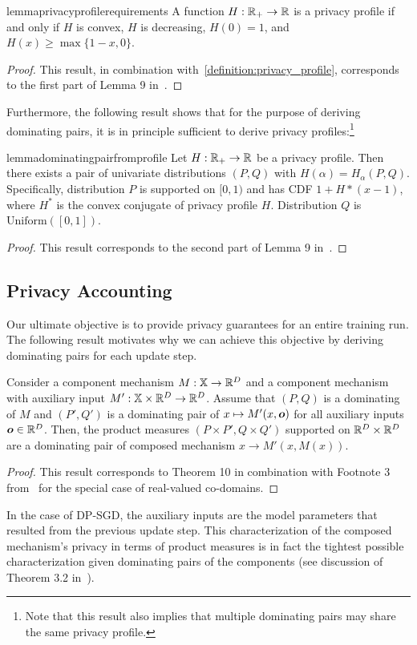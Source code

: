 \begin{restatable}{lemma}{privacyprofilerequirements}\label{lemma:privacy_profile_requirements}
    A function $H : {\mathbb{R}}_+ \rightarrow {\mathbb{R}}$ is a privacy profile if and only if
    $H$ is convex, $H$ is decreasing, $H(0) = 1$, and $H(x) \geq \max\{1-x, 0\}$.
\end{restatable}
\begin{proof}
    This result, in combination with~\cref{definition:privacy_profile}, corresponds to the first part of  Lemma 9 in~\cite{zhu2022optimal}.
\end{proof}
Furthermore, the following result shows that for the purpose of deriving dominating pairs, it is in principle sufficient to derive privacy profiles:\footnote{Note that this result also implies that multiple dominating pairs may share the same privacy profile.}
\begin{restatable}{lemma}{dominatingpairfromprofile}\label{lemma:dominating_pair_from_profile}
    Let $H: {\mathbb{R}}_+ \rightarrow {\mathbb{R}}$ be a privacy profile.
    Then there exists a pair of univariate distributions $(P, Q)$ with $H(\alpha) = H_\alpha(P,Q)$.
    Specifically, distribution $P$ is supported on $[0,1)$ and has CDF $1 + H*(x-1)$, where $H^*$ is the convex conjugate of privacy profile $H$.
    Distribution $Q$ is $\mathrm{Uniform}([0,1])$.
\end{restatable}
\begin{proof}
    This result corresponds to the second part of Lemma 9 in~\cite{zhu2022optimal}.
\end{proof}

\subsection{Privacy Accounting}\label{appendix:background_accounting}
Our ultimate objective is to provide privacy guarantees for an entire training run.
The following result motivates why we can achieve this objective by deriving dominating pairs for each update step.
\begin{lemma}\label{lemma:general_composition}
    Consider a component mechanism $M : {\mathbb{X}} \rightarrow {\mathbb{R}}^D$
    and a component mechanism with auxiliary input $M' : {\mathbb{X}} \times {\mathbb{R}}^D \rightarrow {\mathbb{R}}^D$.
    Assume that $(P,Q)$ is a dominating of $M$
    and $(P', Q')$ is a dominating pair of $x \mapsto M'(x, {\bm{o}})$ for all auxiliary inputs ${\bm{o}} \in {\mathbb{R}}^D$.
    Then,  the product measures $(P \times P', Q \times Q')$ supported on ${\mathbb{R}}^D \times {\mathbb{R}}^D$ 
    are a dominating pair of composed mechanism $x \rightarrow M'(x, M(x))$.
\end{lemma}
\begin{proof}
    This result corresponds to Theorem 10 in combination with Footnote 3 from~\cite{zhu2022optimal} for the special case of real-valued co-domains.
\end{proof}
In the case of DP-SGD, the auxiliary inputs are the model parameters that resulted from the previous update step. This characterization of the composed mechanism's privacy in terms of product measures is in fact the tightest possible characterization given dominating pairs of the components (see discussion of Theorem 3.2 in~\cite{dong2022gaussian}). 


